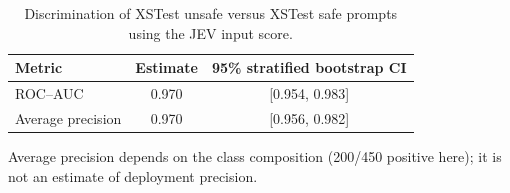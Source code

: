 \begin{table}[t]
\centering
\small
\caption{Discrimination of XSTest unsafe versus XSTest safe prompts using the JEV input score.}
\label{tab:jev_auc}
\begin{tabular}{lcc}
\toprule
Metric & Estimate & 95\% stratified bootstrap CI \\
\midrule
ROC--AUC & 0.970 & [0.954, 0.983] \\
Average precision & 0.970 & [0.956, 0.982] \\
\bottomrule
\end{tabular}
\par\vspace{2pt}
\begin{minipage}{0.97\linewidth}
\footnotesize Average precision depends on the class composition (200/450 positive here); it is not an estimate of deployment precision.
\end{minipage}
\end{table}

